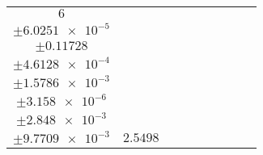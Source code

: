 \documentclass[8pt]{article}
\begin{document}
\begin{longtable}[l]{c c c c c c c c c}
$\num{6}$ & \begin{tabular}[c]{@{}c@{}}$\num{2.9908e-2}$ \\ $\pm\num{6.0251e-5}$\end{tabular} & \begin{tabular}[c]{@{}c@{}}$\num{0.76237}$ \\ $\pm\num{0.11728}$\end{tabular} & \begin{tabular}[c]{@{}c@{}}$\num{8.5021}$ \\ $\pm\num{4.6128e-4}$\end{tabular} & \begin{tabular}[c]{@{}c@{}}$\num{646.29}$ \\ $\pm\num{1.5786e-3}$\end{tabular} & \begin{tabular}[c]{@{}c@{}}$\num{1.2929}$ \\ $\pm\num{3.158e-6}$\end{tabular} & \begin{tabular}[c]{@{}c@{}}$\num{1.1578}$ \\ $\pm\num{2.848e-3}$\end{tabular} & \begin{tabular}[c]{@{}c@{}}$\num{4.1685}$ \\ $\pm\num{9.7709e-3}$\end{tabular} & $\num{2.5498}$\\
\bottomrule
\end{longtable}
\end{document}
